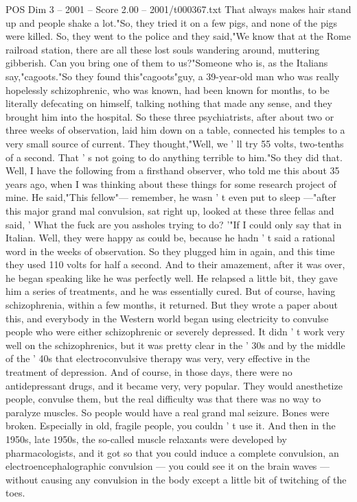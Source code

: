 \begin{textsample}{POS Dim 3 – 2001 – Score 2.00 – 2001/t000367.txt}
That always makes hair stand up and people shake a lot."So, they tried it on a few pigs, and none of the pigs were killed.
So, they went to the police and they said,"We know that at the Rome railroad station, there are all these lost souls wandering around, muttering gibberish.
Can you bring one of them to us?"Someone who is, as the Italians say,"cagoots."So they found this"cagoots"guy, a 39-year-old man who was really hopelessly schizophrenic, who was known, had been known for months, to be literally defecating on himself, talking nothing that made any sense, and they brought him into the hospital.
So these three psychiatrists, after about two or three weeks of observation, laid him down on a table, connected his temples to a very small source of current.
They thought,"Well, we ' ll try 55 volts, two-tenths of a second.
That ' s not going to do anything terrible to him."So they did that.
Well, I have the following from a firsthand observer, who told me this about 35 years ago, when I was thinking about these things for some research project of mine.
He said,"This fellow"— remember, he wasn ' t even put to sleep —"after this major grand mal convulsion, sat right up, looked at these three fellas and said, ' What the fuck are you assholes trying to do? '"If I could only say that in Italian.
Well, they were happy as could be, because he hadn ' t said a rational word in the weeks of observation.
So they plugged him in again, and this time they used 110 volts for half a second.
And to their amazement, after it was over, he began speaking like he was perfectly well.
He relapsed a little bit, they gave him a series of treatments, and he was essentially cured.
But of course, having schizophrenia, within a few months, it returned.
But they wrote a paper about this, and everybody in the Western world began using electricity to convulse people who were either schizophrenic or severely depressed.
It didn ' t work very well on the schizophrenics, but it was pretty clear in the ' 30s and by the middle of the ' 40s that electroconvulsive therapy was very, very effective in the treatment of depression.
And of course, in those days, there were no antidepressant drugs, and it became very, very popular.
They would anesthetize people, convulse them, but the real difficulty was that there was no way to paralyze muscles.
So people would have a real grand mal seizure.
Bones were broken.
Especially in old, fragile people, you couldn ' t use it.
And then in the 1950s, late 1950s, the so-called muscle relaxants were developed by pharmacologists, and it got so that you could induce a complete convulsion, an electroencephalographic convulsion — you could see it on the brain waves — without causing any convulsion in the body except a little bit of twitching of the toes.

\end{textsample}
